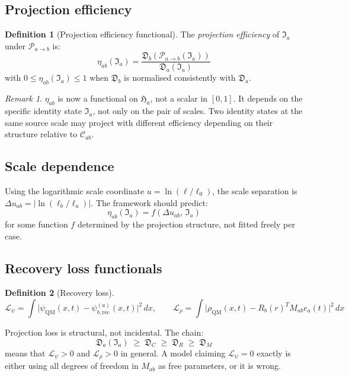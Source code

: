 \documentclass[12pt, a4paper]{article}
\theoremstyle{definition}
\newtheorem{defn}{Definition}[section]
\theoremstyle{plain}
\theoremstyle{remark}
\newtheorem{remark}{Remark}[section]
\newcommand{\Ia}{\mathfrak{I}_a}
\newcommand{\Ha}{\mathfrak{H}_a}        %
\newcommand{\Pab}{\mathcal{P}_{a\to b}}
\newcommand{\Cab}{\mathcal{C}_{ab}}        %
\newcommand{\psirec}{\psi_{b,\mathrm{rec}}^{(a)}}
\newcommand{\psiQM}{\psi_{\mathrm{QM}}}
\newcommand{\rhoQM}{\rho_{\mathrm{QM}}}
\newcommand{\Dista}{\mathfrak{D}_a}
\newcommand{\Distb}{\mathfrak{D}_b}
\newcommand{\etaab}{\eta_{ab}}
\newcommand{\Lpsi}{\mathcal{L}_\psi}
\newcommand{\Lrho}{\mathcal{L}_\rho}
\newcommand{\Rbvec}{R_b(r)}
\newcommand{\eavec}{e_a(t)}
\newcommand{\Mab}{M_{ab}}
\newcommand{\uscl}{u}
\newcommand{\Duab}{\Delta u_{ab}}
\begin{document}
\subsection{Projection efficiency}

\begin{defn}[Projection efficiency functional]
\label{def:eta}
The \emph{projection efficiency} of $\Ia$ under $\Pab$ is:
\[
  \boxed{
    \etaab(\Ia)
    = \frac{\Distb(\Pab(\Ia))}{\Dista(\Ia)}
  }
\]
with $0 \leq \etaab(\Ia) \leq 1$ when $\Distb$ is normalised
consistently with $\Dista$.
\end{defn}

\begin{remark}
$\etaab$ is now a functional on $\Ha$, not a scalar in $[0,1]$.
It depends on the specific identity state $\Ia$, not only on the
pair of scales.
Two identity states at the same source scale may project with
different efficiency depending on their structure relative to $\Cab$.
\end{remark}

\subsection{Scale dependence}

Using the logarithmic scale coordinate $\uscl = \ln(\ell/\ell_0)$,
the scale separation is $\Duab = |\ln(\ell_b/\ell_a)|$.
The framework should predict:
\[
  \etaab(\Ia) = f(\Duab,\,\Ia)
\]
for some function $f$ determined by the projection structure,
not fitted freely per case.

\subsection{Recovery loss functionals}

\begin{defn}[Recovery loss]
\label{def:loss}
\[
  \Lpsi = \int \bigl|\psiQM(x,t) - \psirec(x,t)\bigr|^2\,dx,
  \qquad
  \Lrho = \int \bigl|\rhoQM(x,t) - \Rbvec^T\Mab\eavec\bigr|^2\,dx
\]
\end{defn}

Projection loss is structural, not incidental.
The chain:
\[
  \Dista(\Ia)
  \;\geq\; \mathfrak{D}_C
  \;\geq\; \mathfrak{D}_R
  \;\geq\; \mathfrak{D}_M
\]
means that $\Lpsi > 0$ and $\Lrho > 0$ in general.
A model claiming $\Lpsi = 0$ exactly is either using all degrees of
freedom in $\Mab$ as free parameters, or it is wrong.


\end{document}
